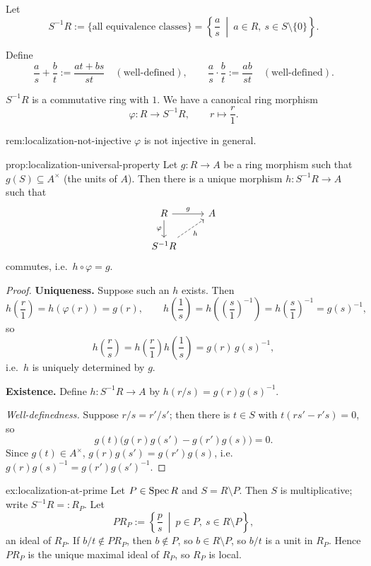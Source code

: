Let
\[
S^{-1}R := \{\text{all equivalence classes}\} = \left\{ \frac{a}{s} \ \middle|\ a \in R,\ s \in S\setminus\{0\} \right\}.
\]

Define
\[
\frac as + \frac bt := \frac{at+bs}{st} \quad (\text{well-defined}), \qquad \frac as \cdot \frac bt := \frac{ab}{st} \quad (\text{well-defined}).
\]

$S^{-1}R$ is a commutative ring with $1$. We have a canonical ring morphism
\[
\varphi: R \to S^{-1}R, \qquad r \mapsto \frac r1.
\]

\begin{remark}{}{rem:localization-not-injective}
$\varphi$ is not injective in general.
\end{remark}

\begin{proposition}{}{prop:localization-universal-property}
Let $g: R \to A$ be a ring morphism such that $g(S) \subseteq A^\times$ (the units of $A$). Then there is a unique morphism $h: S^{-1}R \to A$ such that
\[
\begin{tikzcd}
R \arrow[r, "g"] \arrow[d, "\varphi"'] & A \\
S^{-1}R \arrow[ur, dashed, "h"'] &
\end{tikzcd}
\]
commutes, i.e.\ $h \circ \varphi = g$.
\end{proposition}

\begin{proof}
\textbf{Uniqueness.} Suppose such an $h$ exists. Then
\[
h\!\left(\frac r1\right) = h(\varphi(r)) = g(r), \qquad h\!\left(\frac1s\right) = h\!\left(\left(\frac s1\right)^{-1}\right) = h\!\left(\frac s1\right)^{-1} = g(s)^{-1},
\]
so
\[
h\!\left(\frac rs\right) = h\!\left(\frac r1\right) h\!\left(\frac1s\right) = g(r)\, g(s)^{-1},
\]
i.e.\ $h$ is uniquely determined by $g$.

\textbf{Existence.} Define $h: S^{-1}R \to A$ by $h(r/s) = g(r)g(s)^{-1}$.

\emph{Well-definedness.} Suppose $r/s = r'/s'$; then there is $t \in S$ with $t(rs'-r's)=0$, so
\[
g(t)\bigl(g(r)g(s') - g(r')g(s)\bigr) = 0.
\]
Since $g(t) \in A^\times$, $g(r)g(s') = g(r')g(s)$, i.e.\ $g(r)g(s)^{-1} = g(r')g(s')^{-1}$.
\end{proof}

\begin{example}{}{ex:localization-at-prime}
Let $P \in \operatorname{Spec} R$ and $S = R \setminus P$. Then $S$ is multiplicative; write $S^{-1}R =: R_P$. Let
\[
PR_P := \left\{ \frac ps \ \middle|\ p \in P,\ s \in R\setminus P \right\},
\]
an ideal of $R_P$. If $b/t \notin PR_P$, then $b \notin P$, so $b \in R\setminus P$, so $b/t$ is a unit in $R_P$. Hence $PR_P$ is the unique maximal ideal of $R_P$, so $R_P$ is local.
\end{example}

